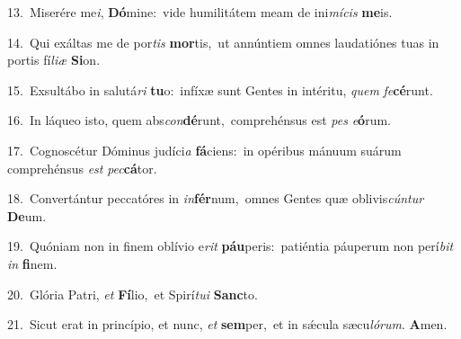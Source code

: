 {\numbfont\textcolor{\numbcolor}{13.}}~Miserére me\-\textit{i}\-, \textbf{Dó}\-mine:~\star vide humilitátem meam de ini\-\textit{mí}\-\textit{cis} \textbf{me}\-is.\par
{\numbfont\textcolor{\numbcolor}{14.}}~Qui exáltas me de por\textit{tis} \textbf{mor}\-tis,~\star ut annúntiem omnes laudatiónes tuas in portis fí\-\textit{li}\-\textit{æ} \textbf{Si}\-on.\par
{\numbfont\textcolor{\numbcolor}{15.}}~Exsultábo in salutá\textit{ri} \textbf{tu}\-o:~\star infíxæ sunt Gentes in intéritu, \textit{quem} \textit{fe}\-\textbf{cé}runt.\par
{\numbfont\textcolor{\numbcolor}{16.}}~In láqueo isto, quem abs\-\textit{con}\-\textbf{dé}runt,~\star comprehénsus est \textit{pes} \textit{e}\-\textbf{ó}rum.\par
{\numbfont\textcolor{\numbcolor}{17.}}~Cognoscétur Dóminus judíci\textit{a} \textbf{fá}\-ciens:~\star in opéribus mánuum suárum comprehénsus \textit{est} \textit{pec}\-\textbf{cá}tor.\par
{\numbfont\textcolor{\numbcolor}{18.}}~Convertántur peccatóres in \textit{in}\-\textbf{fér}num,~\star omnes Gentes quæ oblivis\-\textit{cún}\-\textit{tur} \textbf{De}\-um.\par
{\numbfont\textcolor{\numbcolor}{19.}}~Quóniam non in finem oblívio e\textit{rit} \textbf{páu}\-peris:~\star patiéntia páuperum non perí\textit{bit} \textit{in} \textbf{fi}\-nem.\par
{\numbfont\textcolor{\numbcolor}{20.}}~Glória Patri, \textit{et} \textbf{Fí}\-lio,~\star et Spirí\-\textit{tu}\-\textit{i} \textbf{Sanc}\-to.\par
{\numbfont\textcolor{\numbcolor}{21.}}~Sicut erat in princípio, et nunc, \textit{et} \textbf{sem}\-per,~\star et in sǽcula sæcu\-\textit{ló}\-\textit{rum}. \textbf{A}\-men.\par
